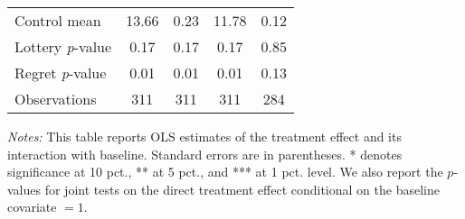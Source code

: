 \begin{table}[htbp]
{\begin{threeparttable}
\begin{tabular}{l*{4}{c}}
Control mean    &    13.66         &     0.23         &    11.78         &     0.12         \\
Lottery \emph{p}-value&     0.17         &     0.17         &     0.17         &     0.85         \\
Regret \emph{p}-value&     0.01         &     0.01         &     0.01         &     0.13         \\
Observations    &      311         &      311         &      311         &      284         \\
\bottomrule \end{tabular} \begin{tablenotes}[flushleft] \footnotesize \item \emph{Notes:} This table reports OLS estimates of the treatment effect and its interaction with baseline. Standard errors are in parentheses. * denotes significance at 10 pct., ** at 5 pct., and *** at 1 pct. level. We also report the \(p\)-values for joint tests on the direct treatment effect conditional on the baseline covariate $= 1$. \end{tablenotes} \end{threeparttable} } \end{table}

